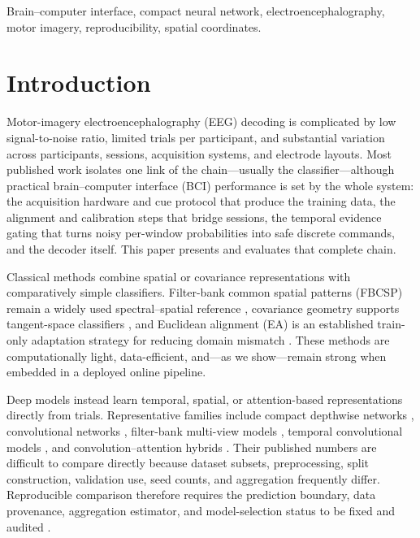 \documentclass[journal,twoside,web]{template/ieeecolor2-tectonic}
\begin{document}
\begin{IEEEkeywords}
Brain--computer interface, compact neural network, electroencephalography,
motor imagery, reproducibility, spatial coordinates.
\end{IEEEkeywords}

\section{Introduction}
\label{sec:introduction}

Motor-imagery electroencephalography (EEG) decoding is complicated by low signal-to-noise ratio, limited trials per participant, and substantial variation across participants, sessions, acquisition systems, and electrode layouts. Most published work isolates one link of the chain---usually the classifier---although practical brain--computer interface (BCI) performance is set by the whole system: the acquisition hardware and cue protocol that produce the training data, the alignment and calibration steps that bridge sessions, the temporal evidence gating that turns noisy per-window probabilities into safe discrete commands, and the decoder itself. This paper presents and evaluates that complete chain.

Classical methods combine spatial or covariance representations with comparatively simple classifiers. Filter-bank common spatial patterns (FBCSP) remain a widely used spectral--spatial reference \cite{Ang2012}, covariance geometry supports tangent-space classifiers \cite{Barachant2012}, and Euclidean alignment (EA) is an established train-only adaptation strategy for reducing domain mismatch \cite{He2020}. These methods are computationally light, data-efficient, and---as we show---remain strong when embedded in a deployed online pipeline.

Deep models instead learn temporal, spatial, or attention-based representations directly from trials. Representative families include compact depthwise networks \cite{Lawhern2018}, convolutional networks \cite{Schirrmeister2017}, filter-bank multi-view models \cite{Mane2021,Liu2023}, temporal convolutional models \cite{Ingolfsson2020}, and convolution--attention hybrids \cite{Song2023,Altaheri2023,Zhao2024,Altaheri2025}. Their published numbers are difficult to compare directly because dataset subsets, preprocessing, split construction, validation use, seed counts, and aggregation frequently differ. Reproducible comparison therefore requires the prediction boundary, data provenance, aggregation estimator, and model-selection status to be fixed and audited \cite{Jayaram2018,Pineau2021}.
\end{document}
